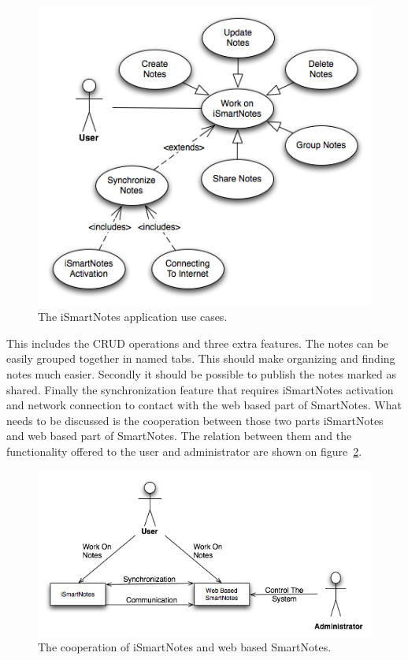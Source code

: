 \begin{figure}[ht]
\begin{center}
\includegraphics[scale=0.5]{charts/work_on_iSmartNotes.png}
\caption{The iSmartNotes application use cases.}
\label{fig:workon_ismartnotes}
\end{center}
\end{figure}
This includes the CRUD operations and three extra features. The notes can be easily grouped together in named tabs. This should make organizing and finding notes much easier. Secondly it should be possible to publish the notes marked as shared. Finally the synchronization feature that requires iSmartNotes activation and network connection to contact with the web based part of SmartNotes. What needs to be discussed is the cooperation between those two parts iSmartNotes and web based part of SmartNotes. The relation between them and the functionality offered to the user and administrator are shown on figure~\ref{fig:ismartnotes_smartnotes}. 
\begin{figure}[ht]
\begin{center}
\includegraphics[scale=0.5]{charts/iSmartNotes_SmartNotes.png}
\caption{The cooperation of iSmartNotes and web based SmartNotes.}
\label{fig:ismartnotes_smartnotes}
\end{center}
\end{figure}

